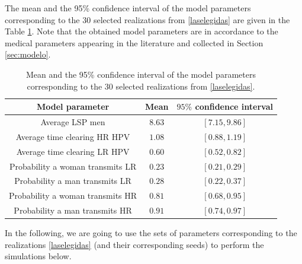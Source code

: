 The mean and the 95\% confidence interval of the model parameters corresponding to the $30$ selected realizations from \eqref{laselegidas} are given in the Table \ref{table:laselegidas}. Note that the obtained model parameters are in accordance to the medical parameters appearing in the literature and collected in Section \ref{sec:modelo}. 

\begin{table}[!h]
	\begin{center}
		\begin{tabular}{|c|c|c|}
			\hline 
			Model parameter & Mean & $95\%$ confidence interval  \\ 
			\hline 
			Average LSP men & $8.63$ & $ [ 7.15 ,  9.86 ]$  \\ 
			Average time clearing HR HPV & $1.08$ &  $[ 0.88 ,  1.19 ]$ \\ 
			Average time clearing LR HPV &  $0.60$ & $ [ 0.52 ,  0.82 ]$\\ 
			Probability a woman transmits LR &  $0.23$ &  $[ 0.21 ,  0.29 ]$\\ 
			Probability a man transmits LR &  $0.28$ &  $[ 0.22 ,  0.37 ]$\\ 
			Probability a woman transmits HR &  $0.81$ & $[ 0.68 ,  0.95 ]$\\ 
			Probability a man transmits HR &  $0.91$ & $[ 0.74 ,  0.97 ]$ \\
			\hline
		\end{tabular}
	\end{center} 	
	\caption{Mean and the 95\% confidence interval of the model parameters corresponding to the $30$ selected realizations from \eqref{laselegidas}.}
	\label{table:laselegidas}
\end{table}

In the following, we are going to use the sets of parameters corresponding to the realizations \eqref{laselegidas} (and their corresponding seeds) to perform the simulations below. 
